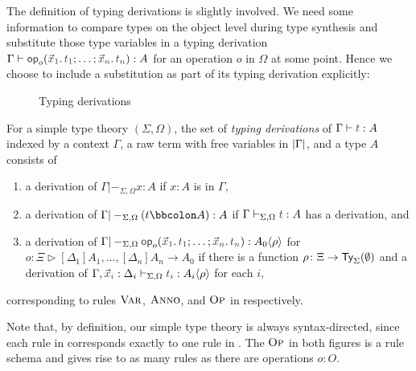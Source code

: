The definition of typing derivations is slightly involved.
We need some information to compare types on the object level during type synthesis and substitute those type variables in a typing derivation $\Gamma \vdash \tmOpts : A$ for an operation $o$ in $\Omega$ at some point.
Hence we choose to include a substitution as part of its typing derivation explicitly:
\begin{definition}\label{def:typing-derivations}
  \begin{figure}
    \centering
    \small
    \caption{Typing derivations}
    \label{fig:extrinsic-typing}
  \end{figure}
  For a simple type theory $(\Sigma, \Omega)$, the set of \emph{typing derivations} of $\Gamma \vdash \isTerm{t} : A$ indexed by a context $\Gamma$, a raw term with free variables in $\left|\Gamma\right|$, and a type $A$ consists of 
  \begin{enumerate}
    \item a derivation of $\Gamma |-_{\Sigma, \Omega} x : A$ if $x : A$ is in $\Gamma$,
    \item a derivation of $\Gamma |-_{\Sigma, \Omega} (t \annotate A) : A$ if $\Gamma \vdash_{\Sigma, \Omega} \isTerm{t} : A$ has a derivation, and
    \item a derivation of $\Gamma |-_{\Sigma, \Omega} \tmOpts : \simsub{A_0}{\rho}$ for $o \colon \Xi \rhd [\Delta_1]A_1, \ldots, [\Delta_{n}]A_{n} \to A_0$ if there is a function $\rho\colon \Xi \to \mathsf{Ty}_{\Sigma}(\emptyset)$ and a derivation of $\Gamma, \vars{x}_{\isTerm{i}} : \Delta_i \vdash_{\Sigma, \Omega} \isTerm{t_i} : \simsub{A_i}{\rho}$ for each $i$,
  \end{enumerate}
  corresponding to rules $\textnormal{\textsc{Var}}$, $\textnormal{\textsc{Anno}}$, and $\textnormal{\textsc{Op}}$ in  respectively.
\end{definition}
Note that, by definition, our simple type theory is always syntax-directed, since each rule in  corresponds exactly to one rule in . 
The $\textnormal{\textsc{Op}}$ in both figures is a rule schema and gives rise to as many rules as there are operations $o : O$.

